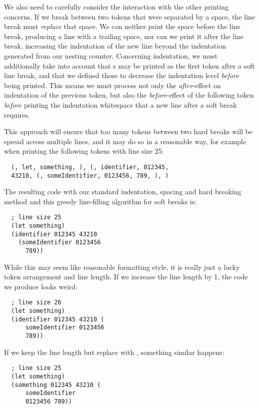 We also need to carefully consider the interaction with the other printing concerns.
If we break between two tokens that were separated by a space,
the line break must \textit{replace} that space.
We can neither print the space before the line break, producing a line with a trailing space,
nor can we print it after the line break, increasing the indentation of the new line
beyond the indentation generated from our nesting counter.
Concerning indentation, we must additionally take into account that s
may be printed as the first token after a soft line break,
and that we defined those to decrease the indentation level \textit{before} being printed.
This means we must process not only the \textit{after}-effect on indentation of the previous token,
but also the \textit{before}-effect of the following token \textit{before}
printing the indentation whitespace that a new line after a soft break requires.

This approach will ensure that too many tokens between two hard breaks will be spread
across multiple lines, and it may do so in a reasonable way,
for example when printing the following tokens with line size 25:
\begin{verbatim}
  (, let, something, ), (, identifier, 012345,
  43210, (, someIdentifier, 0123456, 789, ), )
\end{verbatim}
The resulting code with our standard indentation, spacing and hard breaking method
and this greedy line-filling algorithm for soft breaks is:
\begin{verbatim}
  ; line size 25
  (let something)
  (identifier 012345 43210
    (someIdentifier 0123456
      789))
\end{verbatim}

While this may seem like reasonable formatting style,
it is really just a lucky token arrangement and line length.
If we increase the line length by 1, the code we produce looks weird:
\begin{verbatim}
  ; line size 26
  (let something)
  (identifier 012345 43210 (
      someIdentifier 0123456
      789))
\end{verbatim}
If we keep the line length but replace 
with , something similar happens:
\begin{verbatim}
  ; line size 25
  (let something)
  (something 012345 43210 (
      someIdentifier
      0123456 789))
\end{verbatim}


